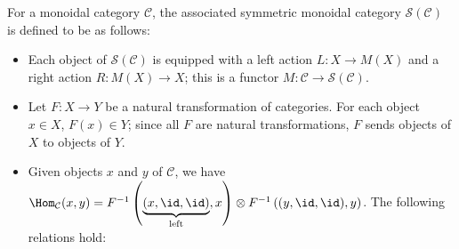 \documentclass[a4paper,reqno,oneside]{article}
\begin{document}
For a monoidal category $\mathcal{C}$, the associated symmetric monoidal category $\mathcal{S}(\mathcal{C})$ is defined to be as follows: 
\begin{itemize}
    \item Each object of $\mathcal{S}(\mathcal{C})$ is equipped with a left action $L \colon X \to M(X)$ and a right action $R \colon M(X) \to X$; this is a functor $M \colon \mathcal{C} \to \mathcal{S}(\mathcal{C})$. 
    \item Let $F \colon X \to Y$ be a natural transformation of categories. For each object $x \in X$, $F(x) \in Y$; since all $F$ are natural transformations, $F$ sends objects of $X$ to objects of $Y$. 
    \item Given objects $x$ and $y$ of $\mathcal{C}$, we have $\Hom_\mathcal{C}(x, y) = F^{-1}\left(\underbrace{(x, \id, \id)}_{\text{left}}, x \right) \otimes F^{-1}\left((y, \id, \id), y\right)$. The following relations hold:  
    \begin{enumerate}
        \item \[ 
            \Hom_\mathcal{C}(f, g) \cong \Hom_\mathcal{C}(F^{-1}\left(f, x\right), F^{-1}\left(g, y\right))
            \] 
        \item \[
            \Hom_\mathcal{C}(f, g) \circ F_{*} = F_{*}\circ F^{-1}
            \]
        \item [\underline{\textnormal{Conservation of identities}}} If $f = id$ and $g = id$, then \[ F\left( f, f \right) = F_{*}\left(f,f \right) \]
    \end{enumerate}
\end{itemize}  




\medskip  
\end{document}
